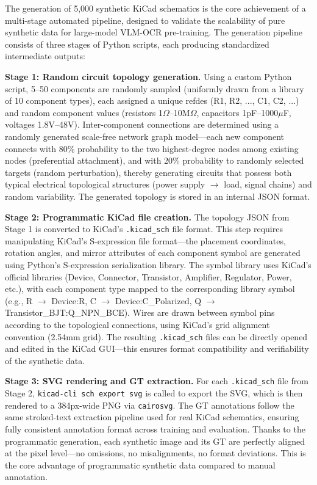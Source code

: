 The generation of 5,000 synthetic KiCad schematics is the core achievement of a multi-stage automated pipeline, designed to validate the scalability of pure synthetic data for large-model VLM-OCR pre-training. The generation pipeline consists of three stages of Python scripts, each producing standardized intermediate outputs:

\textbf{Stage 1: Random circuit topology generation.} Using a custom Python script, 5--50 components are randomly sampled (uniformly drawn from a library of 10 component types), each assigned a unique refdes (R1, R2, ..., C1, C2, ...) and random component values (resistors 1$\Omega$--10M$\Omega$, capacitors 1pF--1000$\mu$F, voltages 1.8V--48V). Inter-component connections are determined using a randomly generated scale-free network graph model---each new component connects with 80\% probability to the two highest-degree nodes among existing nodes (preferential attachment), and with 20\% probability to randomly selected targets (random perturbation), thereby generating circuits that possess both typical electrical topological structures (power supply $\to$ load, signal chains) and random variability. The generated topology is stored in an internal JSON format.

\textbf{Stage 2: Programmatic KiCad file creation.} The topology JSON from Stage 1 is converted to KiCad's \texttt{.kicad\_sch} file format. This step requires manipulating KiCad's S-expression file format---the placement coordinates, rotation angles, and mirror attributes of each component symbol are generated using Python's S-expression serialization library. The symbol library uses KiCad's official libraries (Device, Connector, Transistor, Amplifier, Regulator, Power, etc.), with each component type mapped to the corresponding library symbol (e.g., R $\to$ Device:R, C $\to$ Device:C\_Polarized, Q $\to$ Transistor\_BJT:Q\_NPN\_BCE). Wires are drawn between symbol pins according to the topological connections, using KiCad's grid alignment convention (2.54mm grid). The resulting \texttt{.kicad\_sch} files can be directly opened and edited in the KiCad GUI---this ensures format compatibility and verifiability of the synthetic data.

\textbf{Stage 3: SVG rendering and GT extraction.} For each \texttt{.kicad\_sch} file from Stage 2, \texttt{kicad-cli sch export svg} is called to export the SVG, which is then rendered to a 384px-wide PNG via \texttt{cairosvg}. The GT annotations follow the same stroked-text extraction pipeline used for real KiCad schematics, ensuring fully consistent annotation format across training and evaluation. Thanks to the programmatic generation, each synthetic image and its GT are perfectly aligned at the pixel level---no omissions, no misalignments, no format deviations. This is the core advantage of programmatic synthetic data compared to manual annotation.

